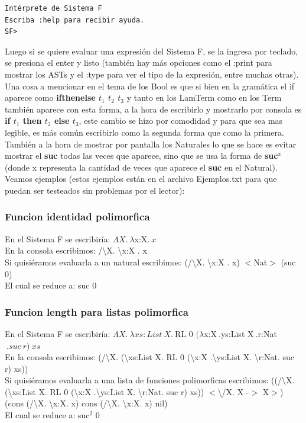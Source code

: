 \documentclass[12pt, titlepage, a4paper]{article}
\begin{document}
\begin{verbatim}
Intérprete de Sistema F
Escriba :help para recibir ayuda.
SF>
\end{verbatim}

Luego si se quiere evaluar una expresión del Sistema F, se la ingresa por teclado, se presiona el enter y listo 
(también hay más opciones como el :print para mostrar los ASTs y el :type para ver el tipo de la expresión, entre muchas otras). \\

Una cosa a mencionar en el tema de los Bool es que si bien en la gramática el if aparece como \textbf{ifthenelse $t_1$ $t_2$ $t_3$} y 
tanto en los LamTerm como en los Term también aparece con esta forma, a la hora de escribirlo y mostrarlo por consola es 
\textbf{if $t_1$ then $t_2$ else $t_3$}, este cambio se hizo por comodidad y para que sea mas legible, es más común escribirlo como la segunda forma que como 
la primera.\\

También a la hora de mostrar por pantalla los Naturales lo que se hace es evitar mostrar el \textbf{suc} todas las veces que aparece, sino que se usa 
la forma de \textbf{suc$^x$} (donde x representa la cantidad de veces que aparece el \textbf{suc} en el Natural). \\

Veamos ejemplos (estos ejemplos están en el archivo Ejemplos.txt para que puedan ser testeados sin problemas por el lector):

\subsubsection{Funcion identidad polimorfica}
\noindent En el Sistema F se escribiría: $\Lambda X.\ \lambda $x:X$. \ x$ \\
En la consola escribimos: /\textbackslash X. \textbackslash x:X . x \\
Si quisiéramos evaluarla a un natural escribimos: (/\textbackslash X. \textbackslash x:X . x)  $<$Nat$>$ (suc 0) \\
El cual se reduce a: suc 0

\subsubsection{Funcion length para listas polimorfica}
\noindent En el Sistema F se escribiría: $\Lambda X.\ \lambda xs:List \ X. \ $RL 0 $(\lambda $x:X$ \ .$ys:List X$ \ .$r:Nat$\ .suc\ r)\ xs$ \\
En la consola escribimos: (/\textbackslash X. (\textbackslash xs:List X. RL 0 (\textbackslash x:X .\textbackslash ys:List X. \textbackslash r:Nat. suc r) xs)) \\
Si quisiéramos evaluarla a una lista de funciones polimorficas escribimos: 
((/\textbackslash X. (\textbackslash xs:List X. RL 0 (\textbackslash x:X .\textbackslash ys:List X. \textbackslash r:Nat. suc r) xs)) $<$\textbackslash/X. X -$>$ X$>$) 
(cons (/\textbackslash X. \textbackslash x:X. x) cons (/\textbackslash X. \textbackslash x:X. x) nil)\\
El cual se reduce a: suc$^2$ 0 \\
\end{document}
